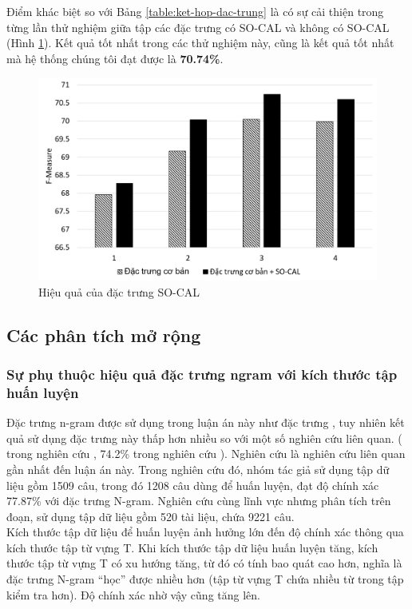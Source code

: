 Điểm khác biệt so với Bảng \ref{table:ket-hop-dac-trung} là có sự cải thiện trong từng lần thử nghiệm giữa tập các đặc trưng có SO-CAL và không có SO-CAL (Hình \ref{fig:socal-vs-co-ban}). Kết quả tốt nhất trong các thử nghiệm này, cũng là kết quả tốt nhất mà hệ thống chúng tôi đạt được là \textbf{70.74\%}.
\begin{figure}[H]
\centering
\includegraphics[scale=0.35]{../hinh/socal_vs_dac_trung_co_ban.png}
\caption{Hiệu quả của đặc trưng SO-CAL} \label{fig:socal-vs-co-ban}
\end{figure}
\subsection{Các phân tích mở rộng} \label{subsec:phan-tich-mo-rong}
\subsubsection*{Sự phụ thuộc hiệu quả đặc trưng ngram với kích thước tập huấn luyện}
Đặc trưng n-gram được sử dụng trong luận án này như đặc trưng , tuy nhiên kết quả sử dụng đặc trưng này thấp hơn nhiều so với một số nghiên cứu liên quan. ( trong nghiên cứu \cite{niu2005analysis}, 74.2\% trong nghiên cứu ). Nghiên cứu  \cite{niu2005analysis} là nghiên cứu liên quan gần nhất đến luận án này. Trong nghiên cứu đó, nhóm tác giả sử dụng tập dữ liệu gồm 1509 câu, trong đó 1208 câu dùng để huấn luyện, đạt độ chính xác 77.87\% với đặc trưng N-gram. Nghiên cứu \cite{sarker2011outcome} cùng lĩnh vực nhưng phân tích trên đoạn, sử dụng tập dữ liệu gồm 520 tài liệu, chứa 9221 câu.\\

Kích thước tập dữ liệu để huấn luyện ảnh hưởng lớn đến độ chính xác thông qua kích thước tập từ vựng T. Khi kích thước tập dữ liệu huấn luyện tăng, kích thước tập từ vựng T có xu hướng tăng, từ đó có tính bao quát cao hơn, nghĩa là đặc trưng N-gram ``học'' được nhiều hơn (tập từ vựng T chứa nhiều từ trong tập kiểm tra hơn).  Độ chính xác nhờ vậy cũng tăng lên. \\


